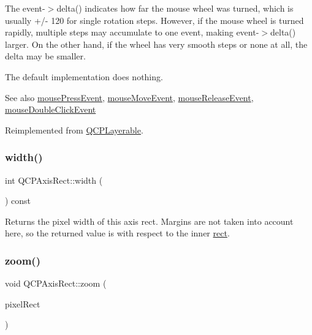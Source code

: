 The {\ttfamily event-\/$>$delta()} indicates how far the mouse wheel was turned, which is usually +/-\/ 120 for single rotation steps. However, if the mouse wheel is turned rapidly, multiple steps may accumulate to one event, making {\ttfamily event-\/$>$delta()} larger. On the other hand, if the wheel has very smooth steps or none at all, the delta may be smaller.

The default implementation does nothing.

\begin{DoxySeeAlso}{See also}
\mbox{\hyperlink{class_q_c_p_axis_rect_aa9a7c807eaa4666870ac94aa6abc4dde}{mouse\+Press\+Event}}, \mbox{\hyperlink{class_q_c_p_axis_rect_a9cd27ad8c5cfb49aefd9dbb30def4beb}{mouse\+Move\+Event}}, \mbox{\hyperlink{class_q_c_p_axis_rect_a6c89b988d3a0b93c0878f0ebdb5037f4}{mouse\+Release\+Event}}, \mbox{\hyperlink{class_q_c_p_layerable_a4171e2e823aca242dd0279f00ed2de81}{mouse\+Double\+Click\+Event}} 
\end{DoxySeeAlso}


Reimplemented from \mbox{\hyperlink{class_q_c_p_layerable_a47dfd7b8fd99c08ca54e09c362b6f022}{Q\+C\+P\+Layerable}}.

\mbox{\label{class_q_c_p_axis_rect_a204645398a4f9d0b0189385c7c2cfb91}} 
\subsubsection{\texorpdfstring{width()}{width()}}
{\footnotesize\ttfamily int Q\+C\+P\+Axis\+Rect\+::width (\begin{DoxyParamCaption}{ }\end{DoxyParamCaption}) const\hspace{0.3cm}{\ttfamily [inline]}}

Returns the pixel width of this axis rect. Margins are not taken into account here, so the returned value is with respect to the inner \mbox{\hyperlink{class_q_c_p_layout_element_a208effccfe2cca4a0eaf9393e60f2dd4}{rect}}. \mbox{\label{class_q_c_p_axis_rect_a5fc8460564e81dcc2a9343dc8bc1fe67}} 
\subsubsection{\texorpdfstring{zoom()}{zoom()}\hspace{0.1cm}{\footnotesize\ttfamily [1/2]}}
{\footnotesize\ttfamily void Q\+C\+P\+Axis\+Rect\+::zoom (\begin{DoxyParamCaption}\item[{const Q\+RectF \&}]{pixel\+Rect }\end{DoxyParamCaption})}

